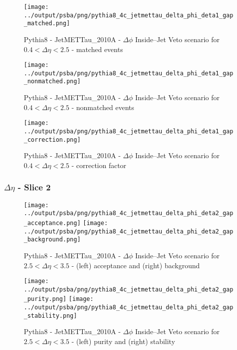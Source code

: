 \documentclass[11pt]{book}
\begin{document}
\begin{figure}[ht]
\centering
\texttt{[image: ../output/psba/png/pythia8\_4c\_jetmettau\_delta\_phi\_deta1\_gap\_matched.png]}
\caption{Pythia8 - JetMETTau\_2010A - $\Delta\phi$ Inside--Jet Veto scenario for $0.4 < \Delta\eta < 2.5$ - matched events}
\label{fig:p8_jetmettau_delta_phi_deta1_gap_matched}
\end{figure}

\begin{figure}[ht]
\centering
\texttt{[image: ../output/psba/png/pythia8\_4c\_jetmettau\_delta\_phi\_deta1\_gap\_nonmatched.png]}
\caption{Pythia8 - JetMETTau\_2010A - $\Delta\phi$ Inside--Jet Veto scenario for $0.4 < \Delta\eta < 2.5$ - nonmatched events}
\label{fig:p8_jetmettau_delta_phi_deta1_gap_nonmatched}
\end{figure}

\begin{figure}[ht]
\centering
\texttt{[image: ../output/psba/png/pythia8\_4c\_jetmettau\_delta\_phi\_deta1\_gap\_correction.png]}
\caption{Pythia8 - JetMETTau\_2010A - $\Delta\phi$ Inside--Jet Veto scenario for $0.4 < \Delta\eta < 2.5$ - correction factor}
\label{fig:p8_jetmettau_delta_phi_deta1_gap_correction}
\end{figure}


\clearpage
\subsubsection{$\Delta\eta$ - Slice 2}
\begin{figure}[ht]
\centering
\texttt{[image: ../output/psba/png/pythia8\_4c\_jetmettau\_delta\_phi\_deta2\_gap\_acceptance.png]}
\texttt{[image: ../output/psba/png/pythia8\_4c\_jetmettau\_delta\_phi\_deta2\_gap\_background.png]}
\caption{Pythia8 - JetMETTau\_2010A - $\Delta\phi$ Inside--Jet Veto scenario for $2.5 < \Delta\eta < 3.5$ - (left) acceptance and (right) background}
\label{fig:p8_jetmettau_delta_phi_deta2_gap_ab}
\end{figure}

\begin{figure}[ht]
\centering
\texttt{[image: ../output/psba/png/pythia8\_4c\_jetmettau\_delta\_phi\_deta2\_gap\_purity.png]}
\texttt{[image: ../output/psba/png/pythia8\_4c\_jetmettau\_delta\_phi\_deta2\_gap\_stability.png]}
\caption{Pythia8 - JetMETTau\_2010A - $\Delta\phi$ Inside--Jet Veto scenario for $2.5 < \Delta\eta < 3.5$ - (left) purity and (right) stability}
\label{fig:p8_jetmettau_delta_phi_deta2_gap_ps}
\end{figure}
\end{document}
